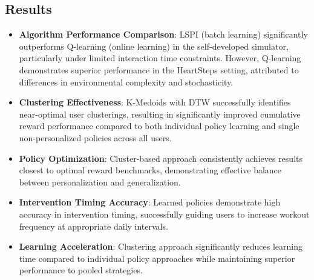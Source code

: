 \subsection*{Results}
\begin{itemize}
    \item \textbf{Algorithm Performance Comparison}: LSPI (batch learning) significantly outperforms Q-learning (online learning) in the self-developed simulator, particularly under limited interaction time constraints. However, Q-learning demonstrates superior performance in the HeartSteps setting, attributed to differences in environmental complexity and stochasticity.
    \item \textbf{Clustering Effectiveness}: K-Medoids with DTW successfully identifies near-optimal user clusterings, resulting in significantly improved cumulative reward performance compared to both individual policy learning and single non-personalized policies across all users.
    \item \textbf{Policy Optimization}: Cluster-based approach consistently achieves results closest to optimal reward benchmarks, demonstrating effective balance between personalization and generalization.
    \item \textbf{Intervention Timing Accuracy}: Learned policies demonstrate high accuracy in intervention timing, successfully guiding users to increase workout frequency at appropriate daily intervals.
    \item \textbf{Learning Acceleration}: Clustering approach significantly reduces learning time compared to individual policy approaches while maintaining superior performance to pooled strategies.
\end{itemize}

